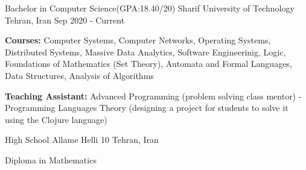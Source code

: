 

\begin{cventries}

  \cventry
  {Bachelor in Computer Science(GPA:18.40/20)} %
  {Sharif University of Technology} %
  {Tehran, Iran} %
  {Sep 2020 - Current} %
  {
    \begin{cvitems} %
      \item {\textbf{Courses:}
          Computer Systems, Computer Networks,
          Operating Systems, Distributed Systems, Massive Data
          Analytics, Software Engineerinig,
          Logic, Foundations of
          Mathematics (Set Theory), Automata and Formal Languages,
          Data Structures, Analysis of Algorithms
        }
      \item {\textbf{Teaching Assistant:} Advanced Programming (problem solving class mentor) - Programming Languages Theory (designing a project for students to solve it using the Clojure language)}
    \end{cvitems}
  }

  \cventry
  {High School} %
  {Allame Helli 10} %
  {Tehran, Iran} %
  {}
  {
    \begin{cvitems} %
    \item {Diploma in Mathematics}
    \end{cvitems}
  }
\end{cventries}
